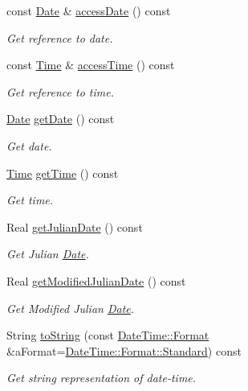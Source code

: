 \begin{DoxyCompactItemize}
const \hyperlink{classlibrary_1_1physics_1_1time_1_1_date}{Date} \& \hyperlink{classlibrary_1_1physics_1_1time_1_1_date_time_aa5042ece04c5b9accf745dbd26ecb0b4}{access\+Date} () const
\begin{DoxyCompactList}\small\item\em Get reference to date. \end{DoxyCompactList}\item 
const \hyperlink{classlibrary_1_1physics_1_1time_1_1_time}{Time} \& \hyperlink{classlibrary_1_1physics_1_1time_1_1_date_time_af3ba24f0db227e42120f022facb6e759}{access\+Time} () const
\begin{DoxyCompactList}\small\item\em Get reference to time. \end{DoxyCompactList}\item 
\hyperlink{classlibrary_1_1physics_1_1time_1_1_date}{Date} \hyperlink{classlibrary_1_1physics_1_1time_1_1_date_time_aa0a2eec8b94810188d004cdd148f422c}{get\+Date} () const
\begin{DoxyCompactList}\small\item\em Get date. \end{DoxyCompactList}\item 
\hyperlink{classlibrary_1_1physics_1_1time_1_1_time}{Time} \hyperlink{classlibrary_1_1physics_1_1time_1_1_date_time_ab3715b775a96688d1b979c0826c8ae8f}{get\+Time} () const
\begin{DoxyCompactList}\small\item\em Get time. \end{DoxyCompactList}\item 
Real \hyperlink{classlibrary_1_1physics_1_1time_1_1_date_time_aea64945314a4dd75f0f8fd0fea9c5c33}{get\+Julian\+Date} () const
\begin{DoxyCompactList}\small\item\em Get Julian \hyperlink{classlibrary_1_1physics_1_1time_1_1_date}{Date}. \end{DoxyCompactList}\item 
Real \hyperlink{classlibrary_1_1physics_1_1time_1_1_date_time_a9c624dbbdd13c81d96f0492eae0d1e2f}{get\+Modified\+Julian\+Date} () const
\begin{DoxyCompactList}\small\item\em Get Modified Julian \hyperlink{classlibrary_1_1physics_1_1time_1_1_date}{Date}. \end{DoxyCompactList}\item 
String \hyperlink{classlibrary_1_1physics_1_1time_1_1_date_time_a6881a196eb787e0d5206005e31041e7e}{to\+String} (const \hyperlink{classlibrary_1_1physics_1_1time_1_1_date_time_a99e6afd988c9b091b1540d707922c804}{Date\+Time\+::\+Format} \&a\+Format=\hyperlink{classlibrary_1_1physics_1_1time_1_1_date_time_a99e6afd988c9b091b1540d707922c804aeb6d8ae6f20283755b339c0dc273988b}{Date\+Time\+::\+Format\+::\+Standard}) const
\begin{DoxyCompactList}\small\item\em Get string representation of date-\/time. \end{DoxyCompactList}\end{DoxyCompactItemize}
